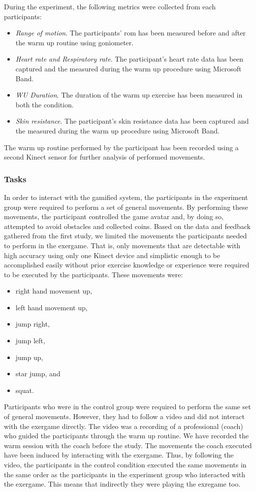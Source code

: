 During the experiment, the following metrics were collected from each participants:
\begin{itemize}
\item \textit{Range of motion}. The participants' \acrshort{rom} has been measured before and after the warm up routine using goniometer.
\item \textit{Heart rate and Respiratory rate}. The participant's heart rate data has been captured and the measured during the warm up procedure using Microsoft Band.
\item \textit{WU Duration}.  The duration of the warm up exercise has been measured in both the condition.
\item \textit{Skin resistance}. The participant's skin resistance data has been captured and the measured during the warm up procedure using Microsoft Band.
\end{itemize}
The warm up routine performed by the participant has been recorded using a second Kinect sensor for further analysis of performed movements.\pagebreak
\subsubsection{Tasks}
In order to interact with the gamified system, the participants in the experiment group were required to perform a set of general movements. By performing these movements, the participant controlled the game avatar and, by doing so, attempted to avoid obstacles and collected coins. Based on the data and feedback gathered from the first study, we limited the movements the participants needed to perform in the exergame. That is, only movements that are detectable with high accuracy using only one Kinect device and simplistic enough to be accomplished easily without prior exercise knowledge or experience were required to be executed by the participants. These movements were: 
\begin{itemize}
\item right hand movement up,
\item left hand movement up,
\item jump right,
\item jump left,
\item jump up, 
\item star jump, and
\item squat.
\end{itemize}
Participants who were in the control group were required to perform the same set of general movements. However, they had to follow a video and did not interact with the exergame directly. The video was a recording of a professional (coach) who guided the participants through the warm up routine. We have recorded the warm session with the coach before the study. The movements the coach executed have been induced by interacting with the exergame. Thus, by following the video, the participants in the control condition executed the same movements in the same order as the participants in the experiment group who interacted with the exergame. This means that indirectly they were playing the exregame too.
